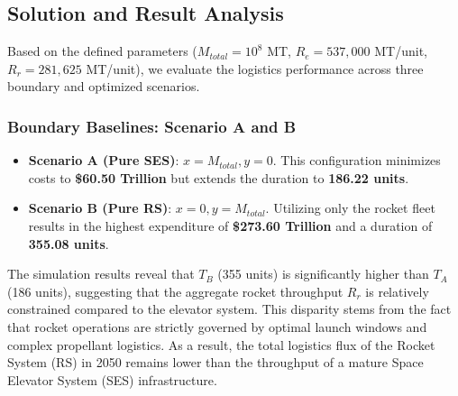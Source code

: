\documentclass{mcmthesis}
\begin{document}
	\subsection{Solution and Result Analysis}
	Based on the defined parameters ($M_{total}=10^8$ MT, $R_e=537,000$ MT/unit, $R_r=281,625$ MT/unit), we evaluate the logistics performance across three boundary and optimized scenarios.
	
	\subsubsection{Boundary Baselines: Scenario A and B}
	\begin{itemize}
		\item \textbf{Scenario A (Pure SES)}: $x = M_{total}, y = 0$. This configuration minimizes costs to \textbf{\$60.50 Trillion} but extends the duration to \textbf{186.22 units}.
		\item \textbf{Scenario B (Pure RS)}: $x = 0, y = M_{total}$. Utilizing only the rocket fleet results in the highest expenditure of \textbf{\$273.60 Trillion} and a duration of \textbf{355.08 units}.
	\end{itemize}
	\hspace{1.5em} The simulation results reveal that $T_B$ (355 units) is significantly higher than $T_A$ (186 units), suggesting that the aggregate rocket throughput $R_r$ is relatively constrained compared to the elevator system. This disparity stems from the fact that rocket operations are strictly governed by optimal launch windows and complex propellant logistics. As a result, the total logistics flux of the Rocket System (RS) in 2050 remains lower than the throughput of a mature Space Elevator System (SES) infrastructure.\\
\end{document}
